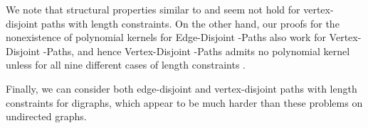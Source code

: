 \documentclass{llncs}
\begin{document}

We note that structural properties similar to  and
seem not hold for vertex-disjoint paths with length constraints.
On the other hand, our proofs for the nonexistence of polynomial kernels for 
{\sc Edge-Disjoint -Paths} also work for {\sc Vertex-Disjoint -Paths}, and hence
{\sc Vertex-Disjoint -Paths} admits no polynomial kernel
unless  for all nine different cases of length constraints
.

Finally, we can consider both edge-disjoint and vertex-disjoint paths with length constraints
for digraphs, which appear to be much harder than these problems on undirected graphs.




\end{document}

